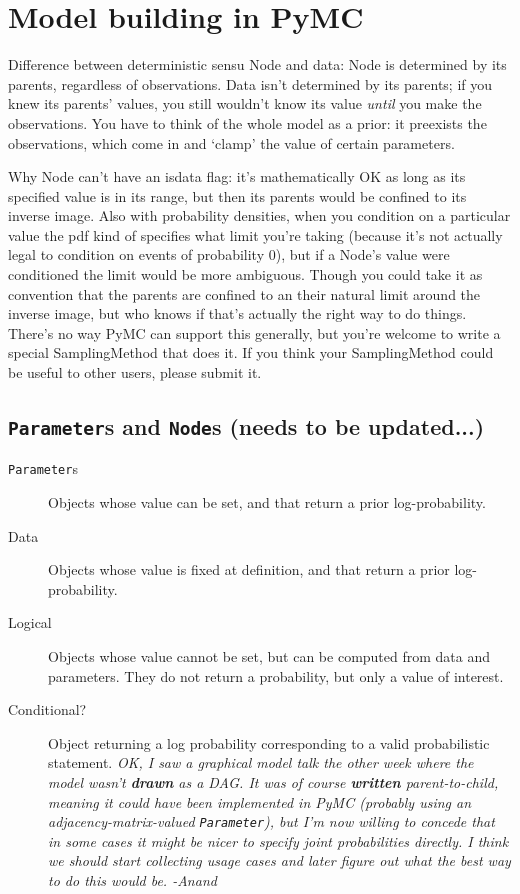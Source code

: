 \documentclass[]{book}
\begin{document}


\chapter{Model building in PyMC} 

Difference between deterministic sensu Node and data: Node is determined by its parents, regardless of observations. Data isn't determined by its parents; if you knew its parents' values, you still wouldn't know its value \emph{until} you make the observations. You have to think of the whole model as a prior: it preexists the observations, which come in and `clamp' the value of certain parameters.

Why Node can't have an isdata flag: it's mathematically OK as long as its specified value is in its range, but then its parents would be confined to its inverse image. Also with probability densities, when you condition on a particular value the pdf kind of specifies what limit you're taking (because it's not actually legal to condition on events of probability 0), but if a Node's value were conditioned the limit would be more ambiguous. Though you could take it as convention that the parents are confined to an their natural limit around the inverse image, but who knows if that's actually the right way to do things. There's no way PyMC can support this generally, but you're welcome to write a special SamplingMethod that does it. If you think your SamplingMethod could be useful to other users, please submit it.

\section{\texttt{Parameter}s and \texttt{Node}s (needs to be updated...)}\label{sec:PyMCObjects} %



\begin{description}
\item[\texttt{Parameter}s] Objects whose value can be set, and that return a prior log-probability.
\item[Data] Objects whose value is fixed at definition, and that return a prior log-probability.
\item[Logical] Objects whose value cannot be set, but can be computed from data and parameters. They do not return a probability, but only a value of interest.
\item[Conditional?] Object returning a log probability corresponding to a valid probabilistic statement. \emph{OK, I saw a graphical model talk the other week where the model wasn't \textbf{drawn} as a DAG. It was of course \textbf{written} parent-to-child, meaning it could have been implemented in PyMC (probably using an adjacency-matrix-valued \texttt{Parameter}), but I'm now willing to concede that in some cases it might be nicer to specify joint probabilities directly. I think we should start collecting usage cases and later figure out what the best way to do this would be. -Anand}
\end{description}
\end{document}
